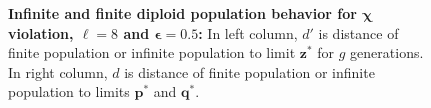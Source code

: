 \begin{figure}[!b]
\begin{center}
\hspace{-3em}%
\vspace{-0.5em}  \hspace{-3em}%


\caption[\textbf{Infinite and finite diploid population behavior for $\bm{\chi}$ violation, $\ell = 8$ and $\bm{\epsilon} = 0.5$}]
{\textbf{Infinite and finite diploid population behavior for $\bm{\chi}$ violation, $\ell = 8$ and $\bm{\epsilon} = 0.5$:} 
In left column, $d'$ is distance of finite population or infinite population to limit $\bm{z}^\ast$ for $g$ generations. 
In right column, $d$ is distance of finite population or infinite population to limits $\bm{p}^\ast$ and $\bm{q}^\ast$.}
\label{oscillation_8d_vio_chi_0.5}
\end{center}
\end{figure}


